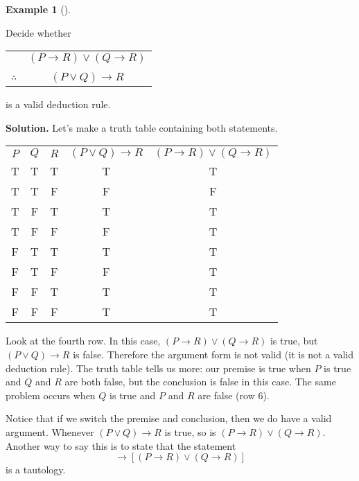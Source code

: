 \documentclass[10pt,]{book}
\theoremstyle{plain}
\theoremstyle{definition}
\newtheorem{example}[theorem]{Example}
\theoremstyle{definition}
\theoremstyle{definition}
\numberwithin{equation}{chapter}
\newcommand{\hrulethin}  {\noalign{\hrule height 0.04em}}
\def\imp{\rightarrow}
\begin{document}
\begin{example}[]\label{example-86}

              Decide whether
\leavevmode%
\begin{table}
\centering
\begin{tabular}{cc}
&\((P \imp R) \vee (Q \imp R)\)\tabularnewline[0pt]
&\tabularnewline\hrulethin
\(\therefore\)&\((P \vee Q) \imp R\)
\end{tabular}
\end{table}
\par

              is a valid deduction rule.
\par\medskip\noindent%
\textbf{Solution.}\quad
              Let's make a truth table containing both statements.
\leavevmode%
\begin{table}
\centering
\begin{tabular}{ccccc}
\(P\)&\(Q\)&\(R\)&\((P\vee Q) \imp R\)&\((P\imp R) \vee (Q \imp R)\)\tabularnewline\hrulethin
T&T&T&T&T\tabularnewline[0pt]
T&T&F&F&F\tabularnewline[0pt]
T&F&T&T&T\tabularnewline[0pt]
T&F&F&F&T\tabularnewline[0pt]
F&T&T&T&T\tabularnewline[0pt]
F&T&F&F&T\tabularnewline[0pt]
F&F&T&T&T\tabularnewline[0pt]
F&F&F&T&T\tabularnewline[0pt]

\end{tabular}
\end{table}
\par

              Look at the fourth row. In this case, \((P \imp R) \vee (Q \imp R)\) is true, but \((P \vee Q) \imp R\) is false. Therefore the argument form is not valid (it is not a valid deduction rule). The truth table tells us more: our premise is true when \(P\) is true and \(Q\) and \(R\) are both false, but the conclusion is false in this case. The same problem occurs when \(Q\) is true and \(P\) and \(R\) are false (row 6).
\par

              Notice that if we switch the premise and conclusion, then we do have a valid argument. Whenever \((P\vee Q) \imp R\) is true, so is \((P \imp R) \vee (Q \imp R)\). Another way to say this is to state that the statement
              \begin{equation*}
                [(P \vee Q) \imp R] \imp [(P \imp R) \vee (Q \imp R)]
              \end{equation*}
              is a tautology.
\end{example}
\typeout{************************************************}
\typeout{************************************************}
\end{document}
